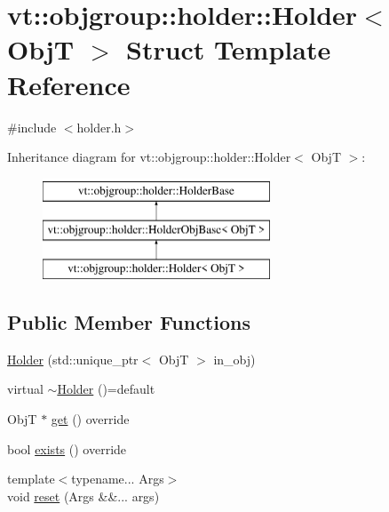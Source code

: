 \hypertarget{structvt_1_1objgroup_1_1holder_1_1_holder}{}\section{vt\+:\+:objgroup\+:\+:holder\+:\+:Holder$<$ ObjT $>$ Struct Template Reference}
\label{structvt_1_1objgroup_1_1holder_1_1_holder}


{\ttfamily \#include $<$holder.\+h$>$}

Inheritance diagram for vt\+:\+:objgroup\+:\+:holder\+:\+:Holder$<$ ObjT $>$\+:\begin{figure}[H]
\begin{center}
\leavevmode
\includegraphics[height=3.000000cm]{structvt_1_1objgroup_1_1holder_1_1_holder}
\end{center}
\end{figure}
\subsection*{Public Member Functions}
\begin{DoxyCompactItemize}
\item 
\hyperlink{structvt_1_1objgroup_1_1holder_1_1_holder_a7e21e5a25aaef942ad43d07e14e726eb}{Holder} (std\+::unique\+\_\+ptr$<$ ObjT $>$ in\+\_\+obj)
\item 
virtual \hyperlink{structvt_1_1objgroup_1_1holder_1_1_holder_acc7eb26ff3152043f63164898469fc78}{$\sim$\+Holder} ()=default
\item 
ObjT $\ast$ \hyperlink{structvt_1_1objgroup_1_1holder_1_1_holder_afa4ab0b8ce4108ad94f602772697c25d}{get} () override
\item 
bool \hyperlink{structvt_1_1objgroup_1_1holder_1_1_holder_a0c18e5f4287e37e6a89a72df90e68273}{exists} () override
\item 
{\footnotesize template$<$typename... Args$>$ }\\void \hyperlink{structvt_1_1objgroup_1_1holder_1_1_holder_a4ce99c48b611a65189a6891c780b6500}{reset} (Args \&\&... args)
\end{DoxyCompactItemize}


